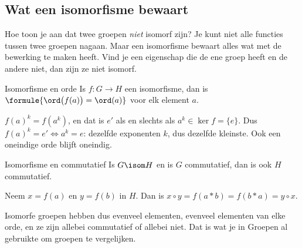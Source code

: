 \begin{oefeningen}
\end{oefeningen}

\subsection{Wat een isomorfisme bewaart}

Hoe toon je aan dat twee groepen \textit{niet} isomorf zijn? Je kunt niet alle functies tussen twee groepen nagaan. Maar een isomorfisme bewaart alles wat met de bewerking te maken heeft. Vind je een eigenschap die de ene groep heeft en de andere niet, dan zijn ze niet isomorf.

\begin{theorie}
\begin{stelling}{Isomorfisme en orde}
Is $f \colon G \to H$ een isomorfisme, dan is \qquad $\formule{\ord\bigl(f(a)\bigr) = \ord(a)}$ \qquad voor elk element $a$.
\end{stelling}

\begin{bewijs}
$f(a)^k = f(a^k)$, en dat is $e'$ als en slechts als $a^k \in \ker f = \{e\}$. Dus $f(a)^k = e' \iff a^k = e$: dezelfde exponenten $k$, dus dezelfde kleinste. Ook een oneindige orde blijft oneindig.
\end{bewijs}
\end{theorie}

\begin{theorie}
\begin{stelling}{Isomorfisme en commutatief}
Is $G \isom H$ en is $G$ commutatief, dan is ook $H$ commutatief.
\end{stelling}

\begin{bewijs}
Neem $x = f(a)$ en $y = f(b)$ in $H$. Dan is $x \circ y = f(a \ast b) = f(b \ast a) = y \circ x$.
\end{bewijs}
\end{theorie}

Isomorfe groepen hebben dus evenveel elementen, evenveel elementen van elke orde, en ze zijn allebei commutatief of allebei niet. Dat is wat je in Groepen al gebruikte om groepen te vergelijken.


